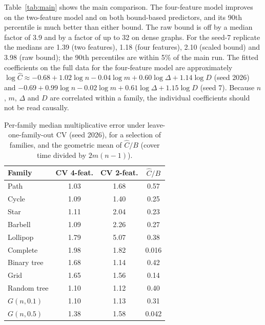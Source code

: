 \documentclass{article}
\begin{document}
Table~\ref{tab:main} shows the main comparison. The four-feature model improves on the two-feature model and on both bound-based predictors, and its 90th percentile is much better than either bound. The raw bound is off by a median factor of 3.9 and by a factor of up to 32 on dense graphs. For the seed-7 replicate the medians are 1.39 (two features), 1.18 (four features), 2.10 (scaled bound) and 3.98 (raw bound); the 90th percentiles are within 5\% of the main run. The fitted coefficients on the full data for the four-feature model are approximately $\log\hat{C}\approx -0.68+1.02\log n-0.04\log m+0.60\log\Delta+1.14\log D$ (seed 2026) and $-0.69+0.99\log n-0.02\log m+0.61\log\Delta+1.15\log D$ (seed 7). Because $n$, $m$, $\Delta$ and $D$ are correlated within a family, the individual coefficients should not be read causally.

\begin{table}[t]
\caption{Per-family median multiplicative error under leave-one-family-out CV (seed 2026), for a selection of families, and the geometric mean of $\hat{C}/B$ (cover time divided by $2m(n-1)$).}
\label{tab:family}
\begin{center}
\begin{small}
\begin{tabular}{lccc}
\toprule
Family & CV 4-feat. & CV 2-feat. & $\hat{C}/B$ \\
\midrule
Path          & 1.03 & 1.68 & 0.57 \\
Cycle         & 1.09 & 1.40 & 0.25 \\
Star          & 1.11 & 2.04 & 0.23 \\
Barbell       & 1.09 & 2.26 & 0.27 \\
Lollipop      & 1.79 & 5.07 & 0.38 \\
Complete      & 1.98 & 1.82 & 0.016 \\
Binary tree   & 1.68 & 1.14 & 0.42 \\
Grid          & 1.65 & 1.56 & 0.14 \\
Random tree   & 1.10 & 1.12 & 0.40 \\
$G(n,0.1)$    & 1.10 & 1.13 & 0.31 \\
$G(n,0.5)$    & 1.38 & 1.58 & 0.042 \\
\bottomrule
\end{tabular}
\end{small}
\end{center}
\vskip -0.1in
\end{table}
\end{document}
